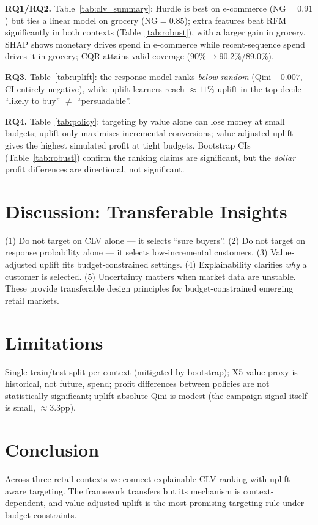\documentclass[11pt]{article}
\begin{document}


\textbf{RQ1/RQ2.} Table~\ref{tab:clv_summary}: Hurdle is best on e-commerce (NG$=0.91$) but ties
a linear model on grocery (NG$=0.85$); extra features beat RFM significantly in both contexts
(Table~\ref{tab:robust}), with a larger gain in grocery. SHAP shows monetary drives spend in
e-commerce while recent-sequence spend drives it in grocery; CQR attains valid coverage
(90\%$\to$90.2\%/89.0\%).

\textbf{RQ3.} Table~\ref{tab:uplift}: the response model ranks \emph{below random} (Qini
$-0.007$, CI entirely negative), while uplift learners reach $\approx 11\%$ uplift in the top
decile --- ``likely to buy'' $\neq$ ``persuadable''.

\textbf{RQ4.} Table~\ref{tab:policy}: targeting by value alone can lose money at small budgets;
uplift-only maximises incremental conversions; value-adjusted uplift gives the highest simulated
profit at tight budgets. Bootstrap CIs (Table~\ref{tab:robust}) confirm the ranking claims are
significant, but the \emph{dollar} profit differences are directional, not significant.

\section{Discussion: Transferable Insights}
(1) Do not target on CLV alone --- it selects ``sure buyers''. (2) Do not target on response
probability alone --- it selects low-incremental customers. (3) Value-adjusted uplift fits
budget-constrained settings. (4) Explainability clarifies \emph{why} a customer is selected.
(5) Uncertainty matters when market data are unstable. These provide transferable design
principles for budget-constrained emerging retail markets.

\section{Limitations}
Single train/test split per context (mitigated by bootstrap); X5 value proxy is historical, not
future, spend; profit differences between policies are not statistically significant; uplift
absolute Qini is modest (the campaign signal itself is small, $\approx 3.3$pp).

\section{Conclusion}
Across three retail contexts we connect explainable CLV ranking with uplift-aware targeting. The
framework transfers but its mechanism is context-dependent, and value-adjusted uplift is the most
promising targeting rule under budget constraints.



\end{document}
